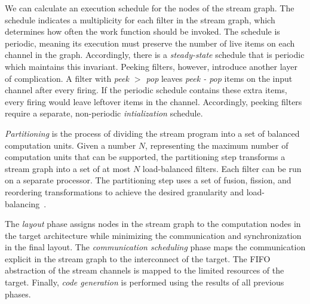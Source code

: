 We can calculate an execution schedule for the nodes of the stream 
graph.  The schedule indicates a multiplicity for each filter in the
stream graph, which determines how often the work function should be
invoked.  The schedule is periodic, meaning its
execution must preserve the number of live items on each channel in
the graph.  Accordingly, there is a {\it steady-state} schedule that is 
periodic which maintains this invariant.  Peeking filters, however, 
introduce another layer of complication.
A filter with {\it peek $>$ pop} leaves {\it peek - pop} items on the
input channel after every firing.  If the periodic schedule contains
these extra items, every firing would leave leftover items
in the channel.  Accordingly, peeking filters require a separate,
non-periodic {\it intialization} schedule.  

{\it Partitioning} is the process of dividing the stream program into
a set of balanced computation units.  Given a number $N$, representing
the maximum number of computation units that can be supported, the 
partitioning step transforms a stream graph into a set of at most $N$
load-balanced filters.  Each filter can be run on a separate processor.
The partitioning step uses a set of fusion, fission, and reordering 
transformations to achieve the desired granularity and load-balancing~\cite{streamit-asplos}.

The {\it layout} phase assigns nodes in the stream graph to the
computation nodes in the target architecture while minimizing the
communication and synchronization in the final layout.  The {\it
communication scheduling} phase maps the communication explicit
in the stream graph to the interconnect of the target.  The FIFO
abstraction of the stream channels is mapped to the limited resources
of the target.  Finally, {\it code generation} is performed using the
results of all previous phases.  